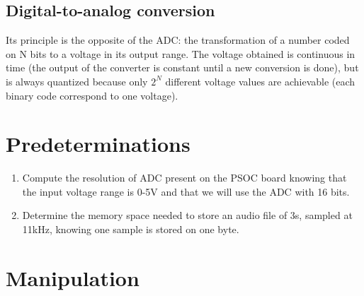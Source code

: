 \documentclass[11pt,a4paper]{article}
\theoremstyle{definition}%
\begin{document}
\subsection{Digital-to-analog conversion}
Its principle is the opposite of the ADC: the transformation of a number coded on N bits to a voltage in its output range.
The voltage obtained is continuous in time (the output of the converter is constant until a new conversion is done), but is always quantized because only $2^N$ different voltage values are achievable (each binary code correspond to one voltage).



\section{Predeterminations}\label{sec:predet}
\begin{enumerate}
	\item Compute the resolution of ADC present on the PSOC board knowing that the input voltage range is 0-5V and that we will use the ADC with 16 bits.
	\item Determine the memory space needed to store an audio file of 3s, sampled at 11kHz, knowing one sample is stored on one byte.
\end{enumerate}



\section{Manipulation}
\end{document}
